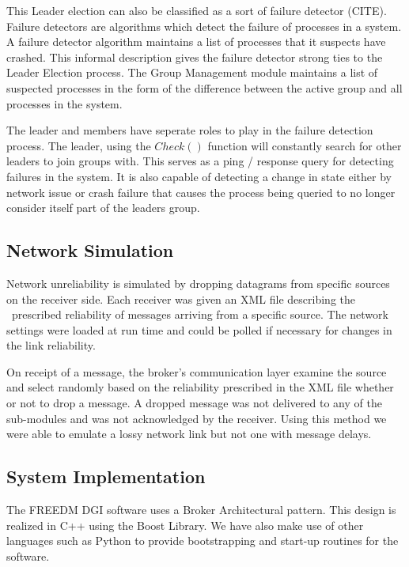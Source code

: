 This Leader election can also be classified as a sort of failure detector (CITE).
Failure detectors are algorithms which detect the failure of processes in a system.
A failure detector algorithm maintains a list of processes that it suspects have
crashed. This informal description gives the failure detector strong ties to the
Leader Election process. The Group Management module maintains a list of suspected
processes in the form of the difference between the active group and all processes
in the system.

The leader and members have seperate roles to play in the failure detection
process. The leader, using the $Check()$ function will constantly search for other
leaders to join groups with. This serves as a ping / response query for detecting
failures in the system. It is also capable of detecting a change in state either
by network issue or crash failure that causes the process being queried to no longer
consider itself part of the leaders group.




\subsection{Network Simulation}

Network unreliability is simulated by dropping datagrams from specific sources 
on the receiver side. Each receiver was given an XML file describing the 
 prescribed reliability of messages arriving from a specific source. The 
network settings were loaded at run time and could be polled if necessary for 
changes in the link reliability.

On receipt of a message, the broker's communication layer examine the source 
and select randomly based on the reliability prescribed in the XML file whether 
or not to drop a message. A dropped message was not delivered to any of the 
sub-modules and was not acknowledged by the receiver. Using this method we were 
able to emulate a lossy network link but not one with message delays.

\subsection{System Implementation}

The FREEDM DGI software uses a Broker Architectural pattern. This design is 
realized in C++ using the Boost Library\cite{BOOST}. We have also make use of 
other languages such as Python to provide bootstrapping and start-up routines 
for the software.

